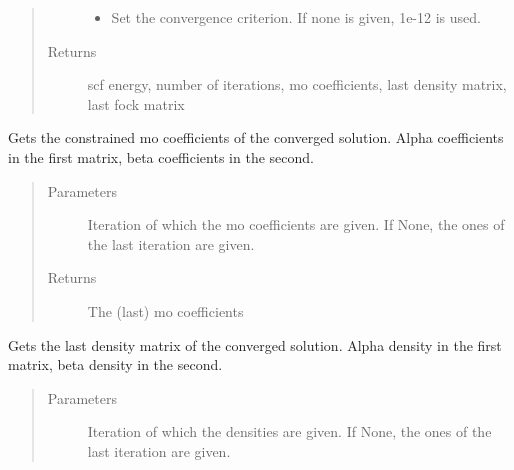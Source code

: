 \documentclass[letterpaper,10pt,english]{sphinxmanual}
\begin{document}
\begin{fulllineitems}
\begin{fulllineitems}
\begin{quote}
\begin{description}
\begin{itemize}
\item {} 
 \textendash{} Set the convergence criterion. If none is given, 1e-12 is used.

\end{itemize}

\item[{Returns}] \leavevmode
scf energy, number of iterations, mo coefficients, last density matrix, last fock matrix

\end{description}\end{quote}

\end{fulllineitems}


\begin{fulllineitems}
\label{\detokenize{cUHF_b:hf.HartreeFock.cUHF_b.MF.get_constrained_mo}}
Gets the constrained mo coefficients of the converged solution.
Alpha coefficients in the first matrix, beta coefficients in the second.
\begin{quote}\begin{description}
\item[{Parameters}] \leavevmode
{} \textendash{} Iteration of which the mo coefficients are given. If None, the ones of the last iteration are given.

\item[{Returns}] \leavevmode
The (last) mo coefficients

\end{description}\end{quote}

\end{fulllineitems}


\begin{fulllineitems}
\label{\detokenize{cUHF_b:hf.HartreeFock.cUHF_b.MF.get_dens}}
Gets the last density matrix of the converged solution.
Alpha density in the first matrix, beta density in the second.
\begin{quote}\begin{description}
\item[{Parameters}] \leavevmode
{} \textendash{} Iteration of which the densities are given. If None, the ones of the last iteration are given.


\end{description}
\end{quote}
\end{fulllineitems}
\end{fulllineitems}
\end{document}
